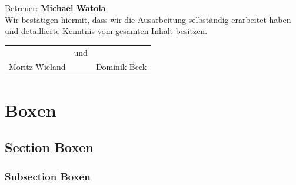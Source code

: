 \documentclass[11pt]{betterallrounder}
\begin{document}
\begin{titlepage}
\begin{center}
        {\large Betreuer: \bfseries{Michael Watola}}\\[1cm]

        {\large Wir bestätigen hiermit, dass wir die Ausarbeitung selbständig erarbeitet haben und
        detaillierte Kenntnis vom gesamten Inhalt besitzen.}\\[1cm]

        \begin{tabular}{rcl}
            \hrulefill & und & \hrulefill\\
            Moritz Wieland & & Dominik Beck
        \end{tabular}
    
        \vfill
    \end{center}
\end{titlepage}


\newpage

\tableofcontents






\chapter*{Boxen}
\setcounter{chapter}{5}
\setcounter{section}{0}
\setcounter{subsection}{0}

\section{Section Boxen}

\subsection{Subsection Boxen}




\end{document}
